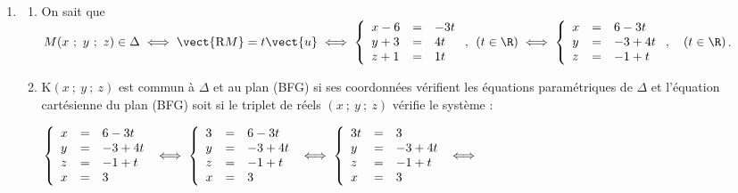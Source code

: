 \begin{enumerate}
$\bullet~~$ Avec le triangle (IEL) rectangle en L (L projeté orthogonal de I sur (EF) :

On a L$\left(\dfrac32~;~0~;~1\right)$, donc IL$^2 = 0 + 0 + 1^2 = 1$, d'où IL $= 1$ ;

On a vu que EI$ = \dfrac{\sqrt{13}}{2}$, d'où $\cos \left(\widehat{\text{EIL}} \right) = \dfrac{\text{IL}}{\text{IE}} = \dfrac{1}{\dfrac{\sqrt{13}}{2}} = \dfrac{2}{\sqrt{13}}$ : la calculatrice donne $\left(\widehat{\text{EIL}} \right) \approx 56,30\degres$ ; donc 
$\widehat{\text{EIF}} = 2\widehat{\text{EIL}}\approx 2 \times 56,30$, soit finalement $\widehat{\text{EIF}} \approx 112,6\degres$.
\item 




	\begin{enumerate}
		\item 
On sait que $M(x~;~y~;~z) \in \Delta \iff \vect{\text{R}M} = t \vect{u} \iff \left\{\begin{array}{l c l}
x - 6&=&- 3t\\
y + 3&=&4t\\
z + 1&=&1t
\end{array}\right.,\:\:  (t \in \R)\iff \left\{\begin{array}{l c l}
x &=&6 - 3t\\
y &=&- 3 + 4t\\
z &=&- 1 + t
\end{array}\right.,\quad  (t \in \R)$.
		\item 
		



K$(x~;~y~;~z)$ est commun à $\Delta$ et au plan (BFG) si ses coordonnées vérifient les équations paramétriques de $\Delta$ et l'équation cartésienne du plan (BFG) soit si le triplet de réels $(x~;~y~;~z)$ vérifie le système :

$\left\{\begin{array}{l c l}
x &=&6 - 3t\\
y &=&- 3 + 4t\\
z &=&- 1 + t\\
x &=& 3
\end{array}\right. \iff \left\{\begin{array}{l c l}
3 &=&6 - 3t\\
y &=&- 3 + 4t\\
z &=&- 1 + t\\
x &=& 3
\end{array}\right. \iff \left\{\begin{array}{l c l}
3t &=&3\\
y &=&- 3 + 4t\\
z &=&- 1 + t\\
x &=& 3
\end{array}\right.\iff$


\end{enumerate}
\end{enumerate}
